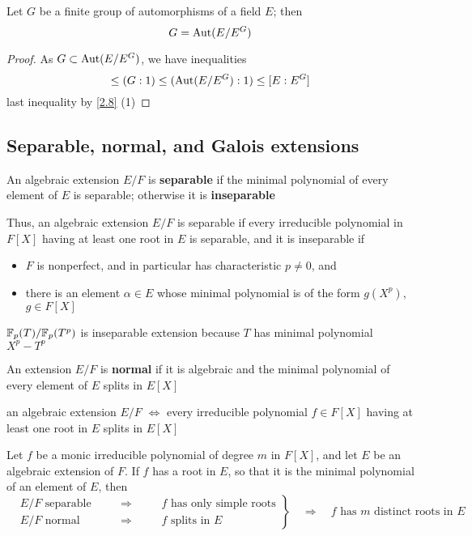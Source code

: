 \documentclass[11pt]{article}
\begin{document}
\begin{corollary}[]
\label{3.5}
Let \(G\) be a finite group of automorphisms of a field \(E\); then
\begin{equation*}
G=\operatorname{\text{Aut}}(E/E^G)
\end{equation*}
\end{corollary}

\begin{proof}
As \(G\subset\operatorname{\text{Aut}}(E/E^G)\), we have inequalities
\begin{equation*}
[E:E^G]\le(G:1)\le(\Aut(E/E^G):1)\le[E:E^G]
\end{equation*}
last inequality by \ref{2.8} (1)
\end{proof}
\subsection{Separable, normal, and Galois extensions}
\label{sec:org69b19f2}
\begin{definition}[]
An algebraic extension \(E/F\) is \textbf{separable} if the minimal polynomial of every element of \(E\)
is separable; otherwise it is \textbf{inseparable}
\end{definition}

Thus, an algebraic extension \(E/F\) is separable if every irreducible polynomial in \(F[X]\)
having at least one root in \(E\) is separable, and it is inseparable if
\begin{itemize}
\item \(F\) is nonperfect, and in particular has characteristic \(p\neq 0\), and
\item there is an element \(\alpha\in E\) whose minimal polynomial is of the form \(g(X^p)\), \(g\in F[X]\)
\end{itemize}


\(\mathbb{F}_p(T)/\mathbb{F}_p(T^p)\) is inseparable extension because \(T\) has minimal polynomial \(X^p-T^p\)

\begin{definition}[]
An extension \(E/F\) is \textbf{normal} if it is algebraic and the minimal polynomial of every element
of \(E\) splits in \(E[X]\)
\end{definition}

an algebraic extension \(E/F\) \(\Leftrightarrow\) every irreducible polynomial \(f\in F[X]\) having at least
one root in \(E\) splits in \(E[X]\)

Let \(f\) be a monic irreducible polynomial of degree \(m\) in \(F[X]\), and let \(E\) be an
algebraic extension of \(F\). If \(f\) has a root in \(E\), so that it is the minimal polynomial
of an element of \(E\), then
\begin{equation*}
\left.
\begin{alignat*}{3}
&E/F\text{ separable}\quad&&\Rightarrow\quad&&f\text{ has only simple roots}\\
&E/F\text{ normal}&&\Rightarrow&&f\text{ splits in }E
\end{alignat*}
\right\}\quad\Rightarrow\quad f\text{ has $m$ distinct roots in }E
\end{equation*}
\end{document}
